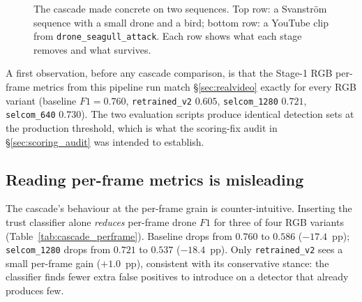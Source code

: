 \documentclass[12pt,a4paper,oneside,openright]{book}
\begin{document}
\begin{figure}[htbp]
    \centering
    \caption{The cascade made concrete on two sequences. Top row: a Svanstr\"om sequence with a small drone and a bird; bottom row: a YouTube clip from \texttt{drone\_seagull\_attack}. Each row shows what each stage removes and what survives.}
    \label{fig:cascade_per_stage}
\end{figure}

A first observation, before any cascade comparison, is that the Stage-1 RGB per-frame metrics from this pipeline run match \S\ref{sec:realvideo} exactly for every RGB variant (baseline $F1=0.760$, \texttt{retrained\_v2} $0.605$, \texttt{selcom\_1280} $0.721$, \texttt{selcom\_640} $0.730$). The two evaluation scripts produce identical detection sets at the production threshold, which is what the scoring-fix audit in \S\ref{sec:scoring_audit} was intended to establish.

\subsection{Reading per-frame metrics is misleading}

The cascade's behaviour at the per-frame grain is counter-intuitive. Inserting the trust classifier alone \emph{reduces} per-frame drone $F1$ for three of four RGB variants (Table~\ref{tab:cascade_perframe}). Baseline drops from $0.760$ to $0.586$ ($-17.4$~pp); \texttt{selcom\_1280} drops from $0.721$ to $0.537$ ($-18.4$~pp). Only \texttt{retrained\_v2} sees a small per-frame gain ($+1.0$~pp), consistent with its conservative stance: the classifier finds fewer extra false positives to introduce on a detector that already produces few.
\end{document}
